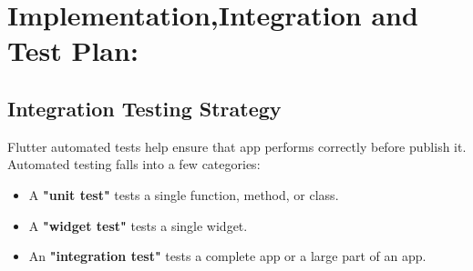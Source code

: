 \documentclass [12pt]{article}
\begin{document}
\section{Implementation,Integration and Test Plan:}
\subsection{Integration Testing Strategy}
Flutter automated tests help ensure that app performs correctly before publish it.
Automated testing falls into a few categories:
\begin{itemize}[•]
\item A \textbf{"unit test"} tests a single function, method, or class.
\item A \textbf{"widget test"} tests a single widget.
\item An \textbf{"integration test"} tests a complete app or a large part of an app.
\end{itemize}
\end{document}

